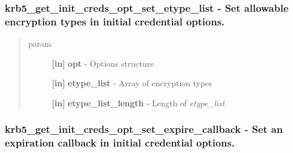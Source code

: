 \documentclass[letterpaper,10pt,english]{sphinxmanual}
\begin{document}
\subsubsection{krb5\_get\_init\_creds\_opt\_set\_etype\_list -  Set allowable encryption types in initial credential options.}
\label{appdev/refs/api/krb5_get_init_creds_opt_set_etype_list:krb5-get-init-creds-opt-set-etype-list-set-allowable-encryption-types-in-initial-credential-options}\label{appdev/refs/api/krb5_get_init_creds_opt_set_etype_list::doc}

\begin{fulllineitems}
\label{appdev/refs/api/krb5_get_init_creds_opt_set_etype_list:krb5_get_init_creds_opt_set_etype_list}
\end{fulllineitems}

\begin{quote}\begin{description}
\item[{param}] \leavevmode
\textbf{{[}in{]}} \textbf{opt} - Options structure

\textbf{{[}in{]}} \textbf{etype\_list} - Array of encryption types

\textbf{{[}in{]}} \textbf{etype\_list\_length} - Length of \emph{etype\_list}

\end{description}\end{quote}


\subsubsection{krb5\_get\_init\_creds\_opt\_set\_expire\_callback -  Set an expiration callback in initial credential options.}
\label{appdev/refs/api/krb5_get_init_creds_opt_set_expire_callback::doc}\label{appdev/refs/api/krb5_get_init_creds_opt_set_expire_callback:krb5-get-init-creds-opt-set-expire-callback-set-an-expiration-callback-in-initial-credential-options}

\begin{fulllineitems}
\label{appdev/refs/api/krb5_get_init_creds_opt_set_expire_callback:krb5_get_init_creds_opt_set_expire_callback}
\end{fulllineitems}
\end{document}
